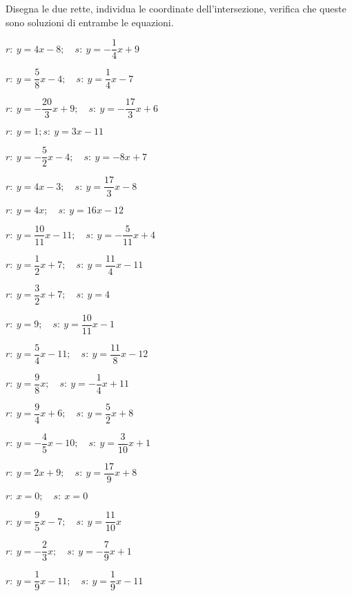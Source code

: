 \begin{esercizio}\label{ese:}
 Disegna le due rette, individua le 
coordinate dell'intersezione, verifica che queste sono soluzioni di 
entrambe le equazioni.
 \begin{multicols}{2}
 \begin{enumeratea}
  \item  $r:~y = 4 x -8; \quad s:~y = -\dfrac{1}{4} x +9$
  \item  $r:~y = \dfrac{5}{8} x -4; \quad s:~y = \dfrac{1}{4} x -7$
  \item  $r:~y = -\dfrac{20}{3} x +9; \quad s:~y = -\dfrac{17}{3} x +6$
  \item  $r:~y = 1; s:~y = 3 x -11$
  \item  $r:~y = -\dfrac{5}{2} x -4; \quad s:~y = -8 x +7$
  \item  $r:~y = 4 x -3; \quad s:~y = \dfrac{17}{3} x -8$
  \item  $r:~y = 4 x ; \quad s:~y = 16 x -12$
  \item  $r:~y = \dfrac{10}{11} x -11; \quad s:~y = -\dfrac{5}{11} x +4$
  \item  $r:~y = \dfrac{1}{2} x +7; \quad s:~y = \dfrac{11}{4} x -11$
  \item  $r:~y = \dfrac{3}{2} x +7; \quad s:~y = 4$
  \item  $r:~y = 9; \quad s:~y = \dfrac{10}{11} x -1$
  \item  $r:~y = \dfrac{5}{4} x -11; \quad s:~y = \dfrac{11}{8} x -12$
  \item  $r:~y = \dfrac{9}{8} x ; \quad s:~y = -\dfrac{1}{4} x +11$
  \item  $r:~y = \dfrac{9}{4} x +6; \quad s:~y = \dfrac{5}{2} x +8$
  \item  $r:~y = -\dfrac{4}{5} x -10; \quad s:~y = \dfrac{3}{10} x +1$
  \item  $r:~y = 2 x +9; \quad s:~y = \dfrac{17}{9} x +8$
  \item  $r:~x = 0; \quad s:~x = 0$
  \item  $r:~y = \dfrac{9}{5} x -7; \quad s:~y = \dfrac{11}{10} x $
  \item  $r:~y = -\dfrac{2}{3} x ; \quad s:~y = -\dfrac{7}{9} x +1$
  \item  $r:~y = \dfrac{1}{9} x -11; \quad s:~y = \dfrac{1}{9} x -11$
 \end{enumeratea}
 \end{multicols}
\end{esercizio}

